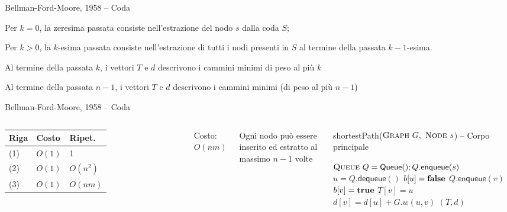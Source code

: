 \begin{frame}{Bellman-Ford-Moore, 1958 -- Coda}

\vspace{-9pt}
\begin{myboxtitle}
\BIL
\item Per $k=0$, la zeresima passata consiste nell'estrazione del nodo $s$ dalla coda $S$;
\item Per $k>0$, la $k$-esima passata consiste nell'estrazione di tutti i nodi 
presenti in $S$ al termine della passata $k-1$-esima.
\EIL
\end{myboxtitle}

\begin{myboxtitle}
\BIL
\item Al termine della passata $k$, i vettori $T$ e $d$ descrivono i cammini minimi di
peso al più $k$ 
\item Al termine della passata $n-1$, i vettori $T$ e $d$ descrivono i cammini minimi
(di peso al più $n-1$)
\EIL
\end{myboxtitle}

\end{frame}

\begin{frame}{Bellman-Ford-Moore, 1958 -- Coda}


\vspace{-9pt}

\begin{columns}

\begingroup
\renewcommand*{\arraystretch}{1.2}
\begin{tabular}{|l|l|l|}
\hline
Riga & Costo & Ripet. \\\hline
(1) & $O(1)$ & 1 \\\hline
(2) & $O(1)$ & $O(n^2)$ \\\hline
(3) & $O(1)$ & $O(nm)$ \\\hline
\end{tabular}
\endgroup

\medskip
Costo: \alert{$O(nm)$}

\medskip
Ogni nodo può essere inserito ed estratto al massimo $n-1$ volte

\vspace{-12pt}
\footnotesize
\begin{Procedure}
\caption[A]{\footnotesize \textsf{shortestPath}($\textsc{Graph}\ G,\ \textsc{Node}\ s$) -- Corpo principale}
\alert{$\textsc{Queue}\ Q = \textsf{Queue}(); Q.\textsf{enqueue}(s)$}\;
{
  \alert{$u = Q.\textsf{dequeue}()$}\;
  $b[u] = \FALSE$\;
  {
    {
      {
        \alert{$Q.\textsf{enqueue}(v)$}\;
        $b[v] = \TRUE$\;
      }
      $T[v] = u$\;
      $d[v] = d[u] + G.w(u,v)$\;
    }
  }
}
\Return $(T,d)$
\end{Procedure}
\end{columns}

\end{frame}

